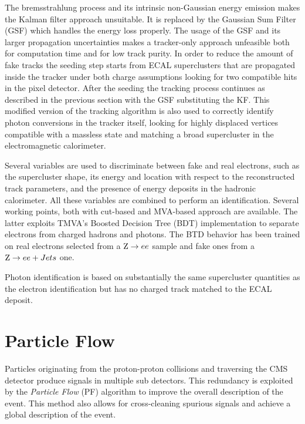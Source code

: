 The bremsstrahlung process and its intrinsic non-Gaussian energy emission makes the Kalman filter approach unsuitable. It is replaced by the Gaussian Sum Filter (GSF) \cite{gsf} which handles the energy loss properly. The usage of the GSF and its larger propagation uncertainties makes a tracker-only approach unfeasible both for computation time and for low track purity. In order to reduce the amount of fake tracks the seeding step starts from ECAL superclusters that are propagated inside the tracker under both charge assumptions looking for two compatible hits in the pixel detector. After the seeding the tracking process continues as described in the previous section with the GSF substituting the KF. This modified version of the tracking algorithm is also used to correctly identify photon conversions in the tracker itself, looking for highly displaced vertices compatible with a massless state and matching a broad supercluster in the electromagnetic calorimeter.

Several variables are used to discriminate between fake and real electrons, such as the supercluster shape, its energy and location with respect to the reconstructed track parameters, and the presence of energy deposits in the hadronic calorimeter. All these variables are combined to perform an identification. Several working points, both with cut-based and MVA-based approach are available. The latter exploits TMVA's \cite{TMVA} Boosted Decision Tree (BDT) implementation to separate electrons from charged hadrons and photons. The BTD behavior has been trained on real electrons selected from a $\mathrm{Z} \rightarrow ee$ sample and fake ones from a $\mathrm{Z} \rightarrow ee + Jets$ one.

Photon identification is based on substantially the same supercluster quantities as the electron identification but has no charged track matched to the ECAL deposit.  

\section{Particle Flow}


Particles originating from the proton-proton collisions and traversing the CMS detector produce signals in multiple sub detectors. This redundancy is exploited by the \emph{Particle Flow} (PF) algorithm to improve the overall description of the event. This method also allows for cross-cleaning spurious signals and achieve a global description of the event.


